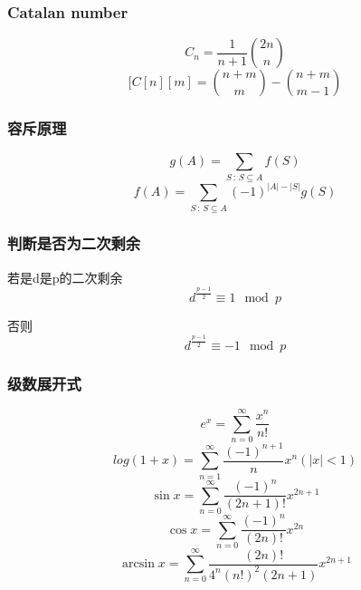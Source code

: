 \subsubsection{Catalan number}
$$ C_n = \frac{1}{n+1}{2n \choose n} $$
$$ [C[n][m] = {n+m \choose m} - {n+m \choose m-1} $$
\subsubsection{容斥原理}
$$ g(A)=\sum_{S\,:\,S\subseteq A}f(S) $$
$$ f(A)=\sum_{S\,:\,S\subseteq A}(-1)^{\left|A\right|-\left|S\right|}g(S) $$
\subsubsection{判断是否为二次剩余}
若是d是p的二次剩余
	$$ d^{\frac{p-1}{2}} \equiv 1 \mod p $$

否则 $$ d^{\frac{p-1}{2}} \equiv -1 \mod p $$
\subsubsection{级数展开式}
	$$ e^x = \sum\limits_{n=0}^{\infty} \frac{x^n}{n!} $$
	$$ log(1+x) = \sum\limits_{n=1}^{\infty} \frac{(-1)^{n+1}}{n}x^n (|x| < 1) $$
	$$ \sin x = \sum\limits_{n=0}^{\infty} \frac{(-1)^n}{(2n+1)!}x^{2n+1} $$
	$$ \cos x = \sum\limits_{n=0}^{\infty} \frac{(-1)^n}{(2n)!}x^{2n} $$
	$$ \arcsin x = \sum\limits_{n=0}^{\infty} \frac{(2n)!}{4^n(n!)^2(2n+1)} x^{2n+1} $$
